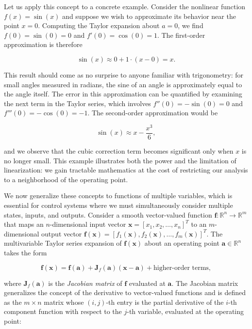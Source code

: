 \begin{example}
Let us apply this concept to a concrete example. Consider the nonlinear function $f(x) = \sin(x)$ and suppose we wish to approximate its behavior near the point $x = 0$. Computing the Taylor expansion about $a = 0$, we find $f(0) = \sin(0) = 0$ and $f'(0) = \cos(0) = 1$. The first-order approximation is therefore

\[
\sin(x) \approx 0 + 1 \cdot (x - 0) = x.
\]

This result should come as no surprise to anyone familiar with trigonometry: for small angles measured in radians, the sine of an angle is approximately equal to the angle itself. The error in this approximation can be quantified by examining the next term in the Taylor series, which involves $f''(0) = -\sin(0) = 0$ and $f'''(0) = -\cos(0) = -1$. The second-order approximation would be

\[
\sin(x) \approx x - \frac{x^3}{6},
\]

and we observe that the cubic correction term becomes significant only when $x$ is no longer small. This example illustrates both the power and the limitation of linearization: we gain tractable mathematics at the cost of restricting our analysis to a neighborhood of the operating point.
\end{example}

We now generalize these concepts to functions of multiple variables, which is essential for control systems where we must simultaneously consider multiple states, inputs, and outputs. Consider a smooth vector-valued function $\mathbf{f}: \mathbb{R}^n \to \mathbb{R}^m$ that maps an $n$-dimensional input vector $\mathbf{x} = [x_1, x_2, \ldots, x_n]^T$ to an $m$-dimensional output vector $\mathbf{f}(\mathbf{x}) = [f_1(\mathbf{x}), f_2(\mathbf{x}), \ldots, f_m(\mathbf{x})]^T$. The multivariable Taylor series expansion of $\mathbf{f}(\mathbf{x})$ about an operating point $\mathbf{a} \in \mathbb{R}^n$ takes the form

\[
\mathbf{f}(\mathbf{x}) = \mathbf{f}(\mathbf{a}) + \mathbf{J}_f(\mathbf{a})(\mathbf{x}-\mathbf{a}) + \text{higher-order terms},
\]

where $\mathbf{J}_f(\mathbf{a})$ is the \emph{Jacobian matrix} of $\mathbf{f}$ evaluated at $\mathbf{a}$. The Jacobian matrix generalizes the concept of the derivative to vector-valued functions and is defined as the $m \times n$ matrix whose $(i,j)$-th entry is the partial derivative of the $i$-th component function with respect to the $j$-th variable, evaluated at the operating point:

